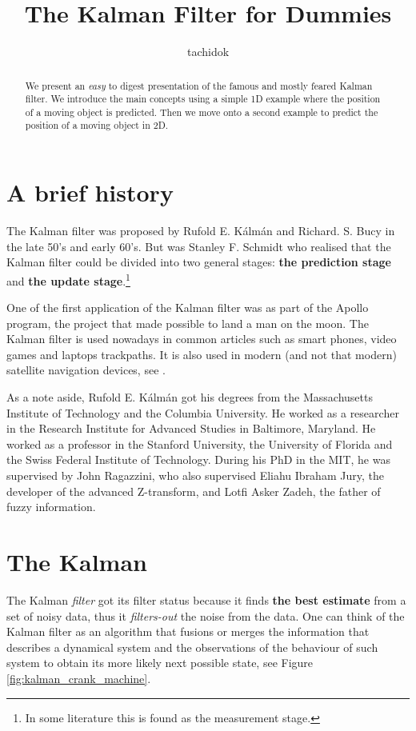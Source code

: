 \documentclass[12pt,a4paper,final]{article} %
\author{tachidok}
\title{The Kalman Filter for Dummies}
\date{ }
\begin{document}
\maketitle

\begin{abstract}
 We present an \textit{easy} to digest presentation of the
  famous and mostly feared Kalman filter. We introduce the main
  concepts using a simple 1D example where the position of a moving
  object is predicted. Then we move onto a second example to predict
  the position of a moving object in 2D.
\end{abstract}

\section{A brief history}
\label{sec:brief_history}

The Kalman filter was proposed by Rufold E. K\'alm\'an and Richard. S.
Bucy in the late 50's and early 60's. But was Stanley F. Schmidt who
realised that the Kalman filter could be divided into two general
stages: \textbf{the prediction stage} and \textbf{the update
  stage}.\footnote{In some literature this is found as the measurement
  stage.}

One of the first application of the Kalman filter was as part of the
Apollo program, the project that made possible to land a man on the
moon. The Kalman filter is used nowadays in common articles such as
smart phones, video games and laptops trackpaths. It is also used in
modern (and not that modern) satellite navigation devices, see
\cite{Faragher:2012:ARTICLE}.

As a note aside, Rufold E. K\'alm\'an got his degrees from the
Massachusetts Institute of Technology and the Columbia University. He
worked as a researcher in the Research Institute for Advanced Studies
in Baltimore, Maryland. He worked as a professor in the Stanford
University, the University of Florida and the Swiss Federal Institute
of Technology. During his PhD in the MIT, he was supervised by John
Ragazzini, who also supervised Eliahu Ibraham Jury, the developer of
the advanced Z-transform, and Lotfi Asker Zadeh, the father of fuzzy
information.

\section{The Kalman}
The Kalman \textit{filter} got its filter status because it finds
\textbf{the best estimate} from a set of noisy data, thus it
\textit{filters-out} the noise from the data. One can think of the
Kalman filter as an algorithm that fusions or merges the information
that describes a dynamical system and the observations of the
behaviour of such system to obtain its more likely next possible
state, see Figure \ref{fig:kalman_crank_machine}.
\end{document}

